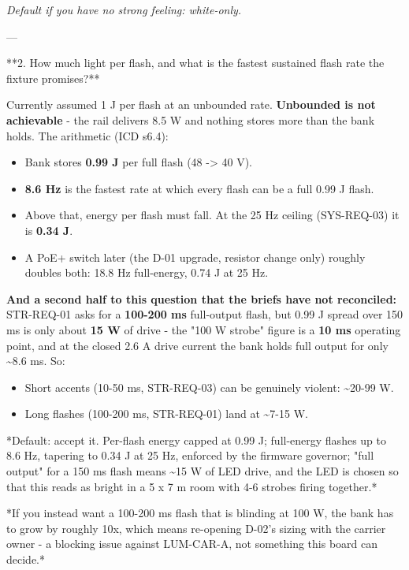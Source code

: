 \documentclass[11pt,a4paper]{article}
\begin{document}
\emph{Default if you have no strong feeling: white-only.}

---

{*}{*}2. How much light per flash, and what is the fastest sustained flash rate the fixture promises?{*}{*}

Currently assumed 1 J per flash at an unbounded rate. \textbf{Unbounded is not achievable} - the rail delivers 8.5 W and nothing stores more than the bank holds. The arithmetic (ICD s6.4):

\begin{itemize}
\item Bank stores \textbf{0.99 J} per full flash (48 -\textgreater{} 40 V).
\item \textbf{8.6 Hz} is the fastest rate at which every flash can be a full 0.99 J flash.
\item Above that, energy per flash must fall. At the 25 Hz ceiling (SYS-REQ-03) it is \textbf{0.34 J}.
\item A PoE+ switch later (the D-01 upgrade, resistor change only) roughly doubles both: 18.8 Hz
full-energy, 0.74 J at 25 Hz.
\end{itemize}
\textbf{And a second half to this question that the briefs have not reconciled:} STR-REQ-01 asks for a \textbf{100-200 ms} full-output flash, but 0.99 J spread over 150 ms is only about \textbf{15 W} of drive - the "100 W strobe" figure is a \textbf{10 ms} operating point, and at the closed 2.6 A drive current the bank holds full output for only \textasciitilde{}8.6 ms. So:

\begin{itemize}
\item Short accents (10-50 ms, STR-REQ-03) can be genuinely violent: \textasciitilde{}20-99 W.
\item Long flashes (100-200 ms, STR-REQ-01) land at \textasciitilde{}7-15 W.
\end{itemize}
{*}Default: accept it. Per-flash energy capped at 0.99 J; full-energy flashes up to 8.6 Hz, tapering to 0.34 J at 25 Hz, enforced by the firmware governor; "full output" for a 150 ms flash means \textasciitilde{}15 W of LED drive, and the LED is chosen so that this reads as bright in a 5 x 7 m room with 4-6 strobes firing together.{*}

{*}If you instead want a 100-200 ms flash that is blinding at 100 W, the bank has to grow by roughly 10x, which means re-opening D-02's sizing with the carrier owner - a blocking issue against LUM-CAR-A, not something this board can decide.{*}
\end{document}
